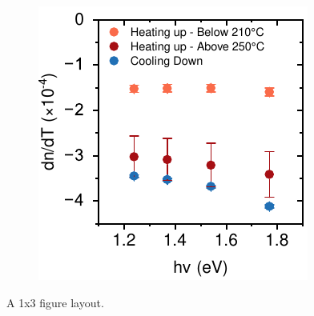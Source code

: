 \begin{figure}[htbp]
\begin{subfigure}{0.32\textwidth}
        \caption{}
        \label{fig:ellipsometry:thermooptic_cooling}
    \end{subfigure}
    \hfill
    \begin{subfigure}{0.3\textwidth}
        \includegraphics[width=\textwidth]{chapters/ellipsometry/image/Thermo-optic_Coefficient_energy.pdf}
        \caption{}
        \label{fig:ellipsometry:thermooptic_energy}
    \end{subfigure}
    \caption{A 1x3 figure layout.}
    \label{fig:ellipsometry:thermooptic}
\end{figure}





